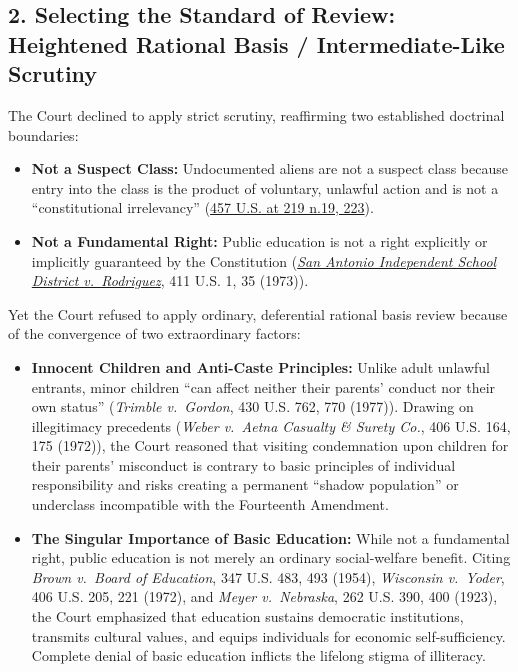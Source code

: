 \documentclass[12pt]{article}
\begin{document}
\subsection*{2. Selecting the Standard of Review: Heightened Rational Basis / Intermediate-Like Scrutiny}
The Court declined to apply strict scrutiny, reaffirming two established doctrinal boundaries:
\begin{itemize}
    \item \textbf{Not a Suspect Class:} Undocumented aliens are not a suspect class because entry into the class is the product of voluntary, unlawful action and is not a ``constitutional irrelevancy'' (\href{https://www.law.cornell.edu/supremecourt/text/457/202}{457 U.S. at 219 n.19, 223}).
    \item \textbf{Not a Fundamental Right:} Public education is not a right explicitly or implicitly guaranteed by the Constitution (\href{https://supreme.justia.com/cases/federal/us/411/1/}{\textit{San Antonio Independent School District v.\ Rodriguez}}, 411 U.S. 1, 35 (1973)).
\end{itemize}

Yet the Court refused to apply ordinary, deferential rational basis review because of the convergence of two extraordinary factors:
\begin{itemize}
    \item \textbf{Innocent Children and Anti-Caste Principles:} Unlike adult unlawful entrants, minor children ``can affect neither their parents' conduct nor their own status'' (\textit{Trimble v.\ Gordon}, 430 U.S. 762, 770 (1977)). Drawing on illegitimacy precedents (\textit{Weber v.\ Aetna Casualty \& Surety Co.}, 406 U.S. 164, 175 (1972)), the Court reasoned that visiting condemnation upon children for their parents' misconduct is contrary to basic principles of individual responsibility and risks creating a permanent ``shadow population'' or underclass incompatible with the Fourteenth Amendment.
    \item \textbf{The Singular Importance of Basic Education:} While not a fundamental right, public education is not merely an ordinary social-welfare benefit. Citing \textit{Brown v.\ Board of Education}, 347 U.S. 483, 493 (1954), \textit{Wisconsin v.\ Yoder}, 406 U.S. 205, 221 (1972), and \textit{Meyer v.\ Nebraska}, 262 U.S. 390, 400 (1923), the Court emphasized that education sustains democratic institutions, transmits cultural values, and equips individuals for economic self-sufficiency. Complete denial of basic education inflicts the lifelong stigma of illiteracy.
\end{itemize}
\end{document}
